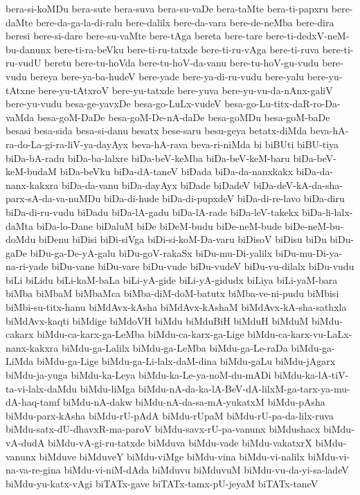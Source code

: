 {bera-si-koMDu
bera-sute
bera-suva
bera-su-vaDe
bera-taMte
bera-ti-papxru
bere-daMte
bere-da-ga-la-di-ralu
bere-dalilx
bere-da-vara
bere-de-neMba
bere-dira
beresi
bere-si-dare
bere-su-vaMte
bere-tAga
bereta
bere-tare
bere-ti-dedxV-neM-bu-danunx
bere-ti-ra-beVku
bere-ti-ru-tatxde
bere-ti-ru-vAga
bere-ti-ruva
bere-ti-ru-vudU
beretu
bere-tu-hoVda
bere-tu-hoV-da-vanu
bere-tu-hoV-gu-vudu
bere-vudu
bereya
bere-ya-ba-hudeV
bere-yade
bere-ya-di-ru-vudu
bere-yalu
bere-yu-tAtxne
bere-yu-tAtxroV
bere-yu-tatxde
bere-yuva
bere-yu-vu-da-nAnx-galiV
bere-yu-vudu
besa-ge-yavxDe
besa-go-LuLx-vudeV
besa-go-Lu-titx-daR-ro-Da-vaMda
besa-goM-DaDe
besa-goM-De-nA-daDe
besa-goMDu
besa-goM-baDe
besasi
besa-sida
besa-si-danu
besatx
bese-saru
besu-geya
betatx-diMda
beva-hA-ra-do-La-gi-ra-liV-ya-dayAyx
beva-hA-rava
beva-ri-niMda
bi
biBUti
biBU-tiya
biDa-bA-radu
biDa-ba-lalxre
biDa-beV-keMba
biDa-beV-keM-baru
biDa-beV-keM-budaM
biDa-beVku
biDa-dA-taneV
biDada
biDa-da-nanxkakx
biDa-da-nanx-kakxra
biDa-da-vanu
biDa-dayAyx
biDade
biDadeV
biDa-deV-kA-da-sha-parx-sA-da-va-nuMDu
biDa-di-hude
biDa-di-pupxdeV
biDa-di-re-lavo
biDa-diru
biDa-di-ru-vudu
biDadu
biDa-lA-gadu
biDa-lA-rade
biDa-leV-takekx
biDa-li-lalx-daMta
biDa-lo-Dane
biDaluM
biDe
biDeM-budu
biDe-neM-bude
biDe-neM-bu-doMdu
biDenu
biDisi
biDi-siVga
biDi-si-koM-Da-varu
biDisoV
biDisu
biDu
biDu-gaDe
biDu-ga-De-yA-galu
biDu-goV-rakaSx
biDu-mu-Di-yalilx
biDu-mu-Di-ya-na-ri-yade
biDu-vane
biDu-vare
biDu-vude
biDu-vudeV
biDu-vu-dilalx
biDu-vudu
biLi
biLidu
biLi-kaM-baLa
biLi-yA-gide
biLi-yA-gidudx
biLiya
biLi-yaM-bara
biMba
biMbaM
biMbaMca
biMba-diM-doM-batutx
biMba-ve-ni-pudu
biMbisi
biMbi-su-titx-hanu
biMdAvx-kAsha
biMdAvx-kAshaM
biMdAvx-kA-sha-sathxla
biMdAvx-kaqti
biMdige
biMdoVH
biMdu
biMduBiH
biMduH
biMduM
biMdu-cakarx
biMdu-ca-karx-ga-LeMba
biMdu-ca-karx-ga-Lige
biMdu-ca-karx-vu-LaLx-nanx-kakxra
biMdu-ga-Lalilx
biMdu-ga-LeMba
biMdu-ga-Le-raDa
biMdu-ga-LiMda
biMdu-ga-Lige
biMdu-ga-Li-lalx-daM-dina
biMdu-gaLu
biMdu-jAgarx
biMdu-ja-yuga
biMdu-ka-Leya
biMdu-ka-Le-ya-noM-du-mADi
biMdu-ka-lA-tiV-ta-vi-lalx-daMdu
biMdu-liMga
biMdu-nA-da-ka-lA-BeV-dA-lilxM-ga-tarx-ya-mu-dA-haq-tamf
biMdu-nA-dakw
biMdu-nA-da-sa-mA-yukatxM
biMdu-pAsha
biMdu-parx-kAsha
biMdu-rU-pAdA
biMdu-rUpaM
biMdu-rU-pa-da-lilx-ruva
biMdu-satx-dU-dhavxR-ma-paroV
biMdu-savx-rU-pa-vanunx
biMdushacx
biMdu-vA-dudA
biMdu-vA-gi-ru-tatxde
biMduva
biMdu-vade
biMdu-vakatxrX
biMdu-vanunx
biMduve
biMduveY
biMdu-viMge
biMdu-vina
biMdu-vi-nalilx
biMdu-vi-na-va-re-gina
biMdu-vi-niM-dAda
biMduvu
biMduvuM
biMdu-vu-da-yi-sa-ladeV
biMdu-yu-katx-vAgi
biTATx-gave
biTATx-tamx-pU-jeyaM
biTATx-taneV
}
